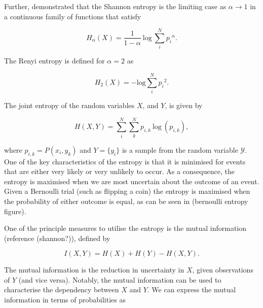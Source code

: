 \noindent Further, \cite{rrnyi1961measures} demonstrated that the Shannon entropy is the limiting case as $\alpha \rightarrow 1$ in a continuous family of functions that satisfy

\begin{equation}
	H_\alpha(X) = \frac{1}{1 -\alpha} \: \text{log}\:\sum_i^N{{p_i}^\alpha}.
\end{equation}

\noindent The Renyi entropy is defined for $\alpha = 2$ as 

\begin{equation}
	\label {renyientropy}
	H_2(X) = - \text{log} \sum_i^N{{p_i}^2}.
\end{equation}

\noindent The joint entropy of the random variables $X$, and $Y$, is given by

\begin{equation}
	H(X, Y) = \sum_i^N\sum_k^N{p_{i,k} \: \text{log} \: (p_{i,k})},
\end{equation}

\noindent where $p_{i,k} = P(x_i,y_k)$ and $Y = \{y_i\}$ is a sample from the random variable $\mathcal{Y}$. One of the key characteristics of the entropy is that it is minimised for events that are either very likely or very unlikely to occur. As a consequence, the entropy is maximised when we are most uncertain about the outcome of an event. Given a Bernoulli trial (such as flipping a coin) the entropy is maximised when the probability of either outcome is equal, as can be seen in (bernoulli entropy figure). 



One of the principle measures to utilise the entropy is the mutual information (reference (shannon?)), defined by

\begin{equation}
	I(X, Y) = H(X) + H(Y)  - H(X, Y).
\end{equation}

The mutual information is the reduction in uncertainty in $X$, given observations of $Y$ (and vice versa). Notably, the mutual information can be used to characterise the dependency between $X$ and $Y$. We can express the mutual information in terms of probabilities as 


